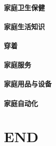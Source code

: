 \documentclass[UTF8]{../../ApplicationUniverse}
\begin{document}
    \subsubsection{家庭卫生保健}
    \subsubsection{家庭生活知识}
    \subsubsection{穿着}
    \subsubsection{家庭服务}
    \subsubsection{家庭用品与设备}
    \subsubsection{家庭自动化}




\chapter{END}
\end{document}
